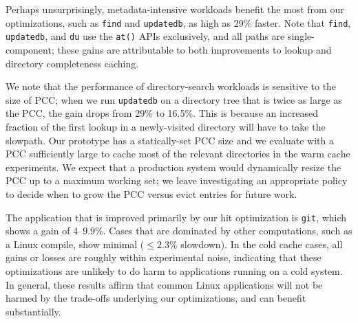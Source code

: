 
Perhaps unsurprisingly, metadata-intensive workloads benefit the most from our optimizations,
such as {\tt find} and {\tt update\-db}, as high 
as 29\% faster.  
Note that {\tt find}, {\tt update\-db}, and {\tt du} 
use the {\tt *at()} APIs exclusively, and all paths are single-component;
these gains are attributable 
to both improvements to lookup and 
directory completeness caching. %

We note that the performance of directory-search workloads is sensitive to the size of PCC;
when we run {\tt updatedb} on a directory tree that is twice as large as the PCC, 
the gain drops from 29\% to 16.5\%.  This is because an increased fraction of the first
lookup in a newly-visited directory will have to take the slowpath.
Our prototype has a statically-set PCC size and 
we evaluate with a PCC sufficiently large to cache most of the relevant directories in 
the warm cache experiments.  We expect that a production system would dynamically resize the 
PCC up to a maximum working set; we leave investigating an appropriate policy to
decide when to grow the PCC versus evict entries for future work.

The application that is improved primarily by our hit optimization is {\tt git},
which shows a gain of 4--9.9\%. %
Cases that are dominated by other computations, such as a Linux compile, show minimal ($\le 2.3\%$ slowdown).
In the cold cache cases, all gains or losses are roughly within experimental noise, 
indicating that these optimizations are unlikely to do harm to applications
running on a cold system.
In general, these results affirm that common Linux applications will not be harmed by 
the trade-offs underlying our optimizations, and can benefit substantially.


